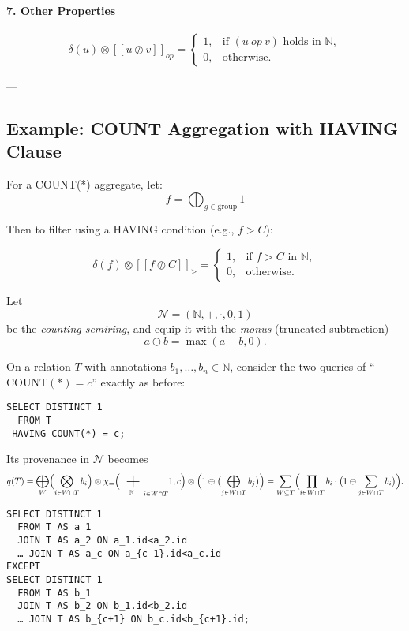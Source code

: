 \begin{toappendix}
\paragraph{7. Other Properties}
\[
\delta(u) \otimes [[u \oslash v]]_{\textit{op}} =
\begin{cases}
1, & \text{if } (u \ \textit{op}\ v) \text{ holds in } \mathbb{N}, \\
0, & \text{otherwise.}
\end{cases}
\]

---

\subsection*{Example: COUNT Aggregation with HAVING Clause}

For a COUNT(*) aggregate, let:
\[
f = \bigoplus_{g \in \text{group}} 1
\]

Then to filter using a HAVING condition (e.g., \( f > C \)):

\[
\delta(f) \otimes [[f \oslash C]]_{>} =
\begin{cases}
1, & \text{if } f > C \text{ in } \mathbb{N}, \\
0, & \text{otherwise.}
\end{cases}
\]

\end{toappendix}


Let
\[
  \mathcal{N} = (\mathbb{N},+,\cdot,0,1)
\]
be the \emph{counting semiring}, and equip it with the \emph{monus} (truncated subtraction)
\[
  a \ominus b =\max(a - b,0).
\]

On a relation \(T\) with annotations \(b_1,\dots,b_n\in\mathbb{N}\), consider the two queries of 
“\(\mathrm{COUNT}(*) = c\)” exactly as before:

\begin{verbatim}
SELECT DISTINCT 1
  FROM T
 HAVING COUNT(*) = c;
\end{verbatim}

Its provenance in \(\mathcal{N}\) becomes
\[
  q(T)
  =
  \bigoplus_{W}
    \Bigl(\bigotimes_{i\in W\cap T}b_i\Bigr)\otimes\chi_{=}\Bigl({\bigplus_{\mathbb{N}}}_{i\in W\cap T} 1, c\Bigr)\otimes\Bigl(1 \ominus \bigl(\bigoplus_{j\in W\cap T}b_j\bigr)\Bigr)
  =
  \sum_{W\subseteq T}
    \Bigl(\prod_{i\in W\cap T}b_i\cdot\bigl(1\ominus\sum_{j\in W\cap T}b_i\bigr)\Bigr).
\]

\begin{verbatim}
SELECT DISTINCT 1
  FROM T AS a_1
  JOIN T AS a_2 ON a_1.id<a_2.id
  … JOIN T AS a_c ON a_{c-1}.id<a_c.id
EXCEPT
SELECT DISTINCT 1
  FROM T AS b_1
  JOIN T AS b_2 ON b_1.id<b_2.id
  … JOIN T AS b_{c+1} ON b_c.id<b_{c+1}.id;
\end{verbatim}

